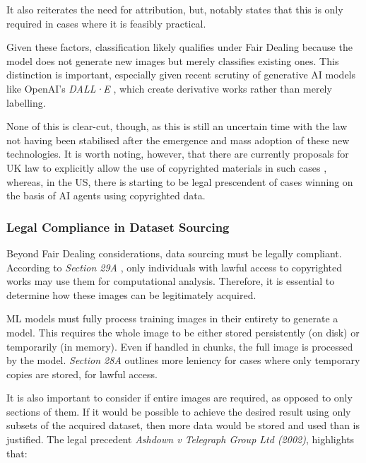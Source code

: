                   It also reiterates the need for attribution, but, notably states that this is only required in cases where it is feasibly practical.
    
                  Given these factors, classification likely qualifies under Fair Dealing because the model does not generate new images but merely classifies existing ones. This distinction is important, especially given recent scrutiny of generative AI models like OpenAI's \textit{DALL·E} \cite{times2025christies_ai_auction, guardian2025ai_art_auction}, which create derivative works rather than merely labelling.
    
                  None of this is clear-cut, though, as this is still an uncertain time with the law not having been stabilised after the emergence and mass adoption \cite{bick2024rapid} of these new technologies. It is worth noting, however, that there are currently proposals for UK law to explicitly allow the use of copyrighted materials in such cases \cite{guardian2024uk_ai_copyright}, whereas, in the US, there is starting to be legal prescendent of cases winning on the basis \cite{apnews2025thomson_reuters_ai_case} of AI agents using copyrighted data.
    
              \subsubsection{Legal Compliance in Dataset Sourcing}
    
                  Beyond Fair Dealing considerations, data sourcing must be legally compliant. According to \textit{Section 29A} \cite{cdpa1988}, only individuals with lawful access to copyrighted works may use them for computational analysis. Therefore, it is essential to determine how these images can be legitimately acquired.
    
                  ML models must fully process training images in their entirety to generate a model. This requires the whole image to be either stored persistently (on disk) or temporarily (in memory). Even if handled in chunks, the full image is processed by the model. \textit{Section 28A} outlines more leniency for cases where only temporary copies are stored, for lawful access.
    
                  It is also important to consider if entire images are required, as opposed to only sections of them. If it would be possible to achieve the desired result using only subsets of the acquired dataset, then more data would be stored and used than is justified. The legal precedent \textit{Ashdown v Telegraph Group Ltd (2002)}, highlights that:
    

